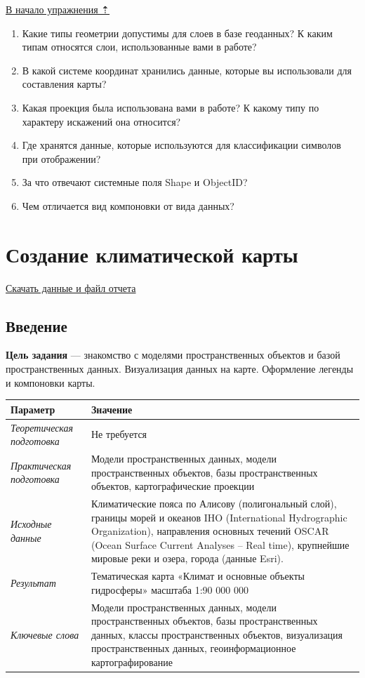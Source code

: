 \documentclass[]{book}
\theoremstyle{definition}
\theoremstyle{definition}
\theoremstyle{definition}
\theoremstyle{remark}
\begin{document}
\protect\hyperlink{map-design-general}{В начало упражнения ⇡}

\begin{enumerate}
\def\labelenumi{\arabic{enumi}.}
\item
  Какие типы геометрии допустимы для слоев в базе геоданных? К каким
  типам относятся слои, использованные вами в работе?
\item
  В какой системе координат хранились данные, которые вы использовали
  для составления карты?
\item
  Какая проекция была использована вами в работе? К какому типу по
  характеру искажений она относится?
\item
  Где хранятся данные, которые используются для классификации символов
  при отображении?
\item
  За что отвечают системные поля Shape и ObjectID?
\item
  Чем отличается вид компоновки от вида данных?
\end{enumerate}

\hypertarget{map-design-climates}{%
\chapter{Создание климатической карты}\label{map-design-climates}}

\href{http://autolab.geogr.msu.ru/gis/data/Ex03.zip}{Скачать данные и
файл отчета}

\hypertarget{map-design-climates-intro}{%
\section{Введение}\label{map-design-climates-intro}}

\textbf{Цель задания} --- знакомство с моделями пространственных
объектов и базой пространственных данных. Визуализация данных на карте.
Оформление легенды и компоновки карты.

\begin{longtable}[]{@{}ll@{}}
\toprule
Параметр & Значение\tabularnewline
\midrule
\endhead
\emph{Теоретическая подготовка} & Не требуется\tabularnewline
\emph{Практическая подготовка} & Модели пространственных данных, модели
пространственных объектов, базы пространственных объектов,
картографические проекции\tabularnewline
\emph{Исходные данные} & Климатические пояса по Алисову (полигональный
слой), границы морей и океанов IHO (International Hydrographic
Organization), направления основных течений OSCAR (Ocean Surface Current
Analyses -- Real time), крупнейшие мировые реки и озера, города (данные
Esri).\tabularnewline
\emph{Результат} & Тематическая карта «Климат и основные объекты
гидросферы» масштаба 1:90 000 000\tabularnewline
\emph{Ключевые слова} & Модели пространственных данных, модели
пространственных объектов, базы пространственных данных, классы
пространственных объектов, визуализация пространственных данных,
геоинформационное картографирование\tabularnewline
\bottomrule
\end{longtable}
\end{document}
